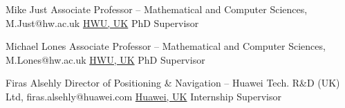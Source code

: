 

\begin{cvhonors}
  \cvhonor
    {Mike Just} %
    { Associate Professor -- Mathematical and Computer Sciences, M.Just@hw.ac.uk} %
    {\href{https://hw.ac.uk}{HWU, UK}} %
    {PhD Supervisor} %



  \cvhonor
    {Michael Lones} %
    { Associate Professor -- Mathematical and Computer Sciences, M.Lones@hw.ac.uk } %
    {\href{https://hw.ac.uk}{HWU, UK}} %
    {PhD Supervisor} %

  \cvhonor
    {Firas Alsehly} %
    { Director of Positioning \& Navigation -- Huawei Tech. R\&D (UK) Ltd, firas.alsehly@huawei.com } %
    {\href{https://www.huawei.com/uk/corporate-information/research-development}{Huawei, UK}} %
    {Internship Supervisor} %



\end{cvhonors}


 